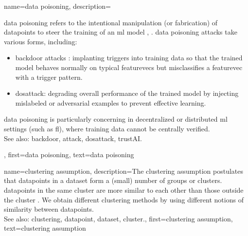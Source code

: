 {name={data poisoning}, 
  description={\Gls{data} poisoning refers to the intentional manipulation 
  	(or fabrication) of \glspl{datapoint} to steer the training of an \gls{ml} \gls{model} \cite{Liu2021}, \cite{PoisonGAN}. 
  	\Gls{data} poisoning \glspl{attack} take various forms, including:
  	\begin{itemize}
  		\item \Gls{backdoor} \glspl{attack} : implanting triggers into training \gls{data} so that the trained \gls{model} 
  		behaves normally on typical \glspl{featurevec} but misclassifies a \gls{featurevec} with a trigger pattern.
  		\item \gls{dosattack}: degrading overall performance of the trained \gls{model} by injecting mislabeled or 
  		adversarial examples to prevent effective learning.
  	\end{itemize}
	\Gls{data} poisoning is particularly concerning in decentralized or distributed \gls{ml} settings (such as \gls{fl}), 
	where training \gls{data} cannot be centrally verified.
				\\
		See also: \gls{backdoor}, \gls{attack}, \gls{dosattack}, \gls{trustAI}.},
	first={data poisoning},
	text={data poisoning} 
}
	
	


{name={clustering assumption}, 
 description={The \gls{clustering} assumption postulates that 
 	\glspl{datapoint} in a \gls{dataset} form a (small) number of groups or \glspl{cluster}. 
 	\Glspl{datapoint} in the same \gls{cluster} are more similar to each 
		other than those outside the \gls{cluster} \cite{SemiSupervisedBook}. We obtain different 
		\gls{clustering} methods by using different notions of similarity between \glspl{datapoint}.
				\\
		See also: \gls{clustering}, \gls{datapoint}, \gls{dataset}, \gls{cluster}.},
		first={clustering assumption},
		text={clustering assumption} }
	
